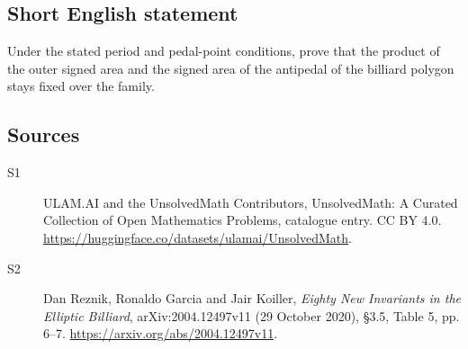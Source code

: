 \documentclass[11pt]{article}
\begin{document}
\subsection{Short English statement}
Under the stated period and pedal-point conditions, prove that the product of the outer signed area and the signed area of the antipedal of the billiard polygon stays fixed over the family.
\subsection{Sources}
\begin{description}
\item[\hypertarget{source:statement:1}{S1}] ULAM.AI and the UnsolvedMath Contributors, UnsolvedMath: A Curated Collection of Open Mathematics Problems, catalogue entry. CC BY 4.0. \url{https://huggingface.co/datasets/ulamai/UnsolvedMath}.
\item[\hypertarget{source:statement:2}{S2}] Dan Reznik, Ronaldo Garcia and Jair Koiller, \emph{Eighty New Invariants in the Elliptic Billiard}, arXiv:2004.12497v11 (29 October 2020), \S3.5, Table 5, pp. 6--7. \url{https://arxiv.org/abs/2004.12497v11}.
\end{description}
\label{end:statement}
\end{document}
